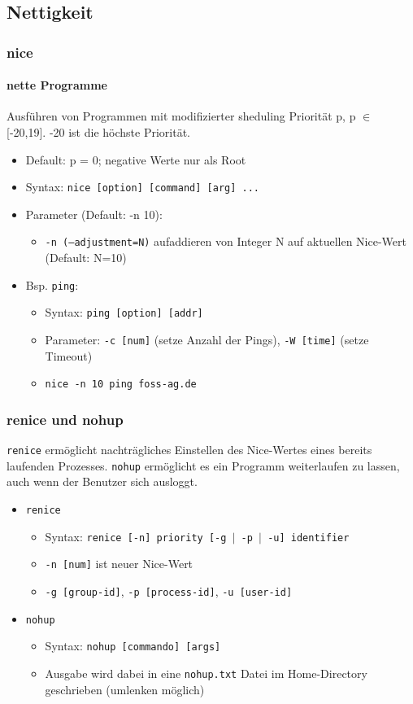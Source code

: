 \documentclass[12pt,utf8]{beamer}
\begin{document}
\subsection{Nettigkeit}
\begin{frame}
\frametitle{nice}
\framesubtitle{nette Programme}
Ausführen von Programmen mit modifizierter sheduling Priorität p, p $\in$ [-20,19]. -20 ist die höchste Priorität.
\begin{itemize}
	\item {\scriptsize Default: p = 0; negative Werte nur als Root}
	\item Syntax: \texttt{nice [option] [command] [arg] ...}
	\item Parameter (Default: -n 10):
	\begin{itemize}
		\item {\scriptsize \texttt{-n (--adjustment=N)} aufaddieren von Integer N auf aktuellen Nice-Wert (Default: N=10)}
	\end{itemize}
	\item Bsp. \texttt{ping}:
	\begin{itemize}[<+->]
		\item {\scriptsize Syntax: \texttt{ping [option] [addr]}}
		\item {\scriptsize Parameter: \texttt{-c [num]} (setze Anzahl der Pings), \texttt{-W [time]} (setze Timeout)}
		\item \texttt{nice -n 10 ping foss-ag.de}
	\end{itemize}
\end{itemize}
\end{frame}

\begin{frame}
\frametitle{renice und nohup}
\texttt{renice} ermöglicht nachträgliches Einstellen des Nice-Wertes eines bereits laufenden Prozesses.
\texttt{nohup} ermöglicht es ein Programm weiterlaufen zu lassen, auch wenn der Benutzer sich ausloggt.
\begin{itemize}
	\item \texttt{renice}
	\begin{itemize}[<+->]
		\item Syntax: \texttt{renice [-n] priority [-g $\mid$ -p $\mid$ -u] identifier}
		\item \texttt{-n [num]} ist neuer Nice-Wert
		\item \texttt{-g [group-id]}, \texttt{-p [process-id]}, \texttt{-u [user-id]}
	\end{itemize}
	\item \texttt{nohup}
	\begin{itemize}
		\item Syntax: \texttt{nohup [commando] [args]}
		\item Ausgabe wird dabei in eine \texttt{nohup.txt} Datei im Home-Directory geschrieben (umlenken möglich)
	\end{itemize}
\end{itemize}
\end{frame}
\end{document}
